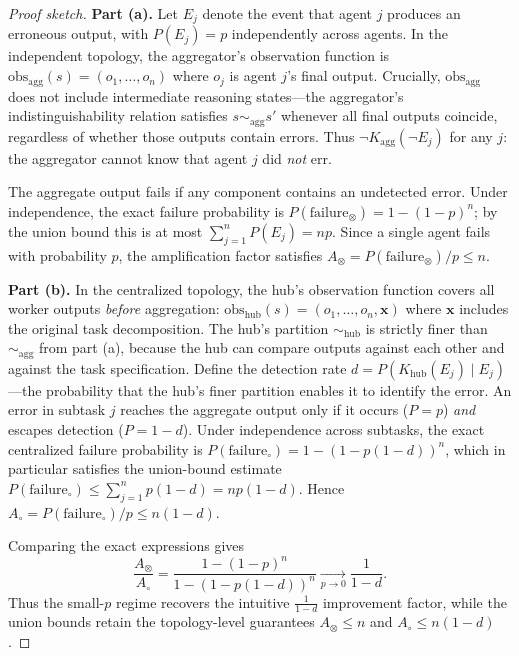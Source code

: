 \begin{proof}[Proof sketch]
\textbf{Part (a).} Let $E_j$ denote the event that agent $j$ produces an erroneous output, with $P(E_j) = p$ independently across agents. In the independent topology, the aggregator's observation function is $\mathrm{obs}_{\mathrm{agg}}(s) = (o_1, \ldots, o_n)$ where $o_j$ is agent $j$'s final output. Crucially, $\mathrm{obs}_{\mathrm{agg}}$ does not include intermediate reasoning states---the aggregator's indistinguishability relation satisfies $s \sim_{\mathrm{agg}} s'$ whenever all final outputs coincide, regardless of whether those outputs contain errors. Thus $\neg K_{\mathrm{agg}}(\neg E_j)$ for any $j$: the aggregator cannot know that agent $j$ did \textit{not} err.

The aggregate output fails if any component contains an undetected error. Under independence, the exact failure probability is $P(\text{failure}_{\otimes}) = 1 - (1-p)^n$; by the union bound this is at most $\sum_{j=1}^{n} P(E_j) = np$. Since a single agent fails with probability $p$, the amplification factor satisfies $A_{\otimes} = P(\text{failure}_{\otimes})/p \le n$.

\textbf{Part (b).} In the centralized topology, the hub's observation function covers all worker outputs \textit{before} aggregation: $\mathrm{obs}_{\mathrm{hub}}(s) = (o_1, \ldots, o_n, \mathbf{x})$ where $\mathbf{x}$ includes the original task decomposition. The hub's partition $\sim_{\mathrm{hub}}$ is strictly finer than $\sim_{\mathrm{agg}}$ from part (a), because the hub can compare outputs against each other and against the task specification. Define the detection rate $d = P(K_{\mathrm{hub}}(E_j) \mid E_j)$---the probability that the hub's finer partition enables it to identify the error. An error in subtask $j$ reaches the aggregate output only if it occurs ($P = p$) \textit{and} escapes detection ($P = 1-d$). Under independence across subtasks, the exact centralized failure probability is $P(\text{failure}_{\circ}) = 1 - (1-p(1-d))^n$, which in particular satisfies the union-bound estimate $P(\text{failure}_{\circ}) \le \sum_{j=1}^{n} p(1-d) = np(1-d)$. Hence $A_{\circ} = P(\text{failure}_{\circ})/p \le n(1-d)$.

Comparing the exact expressions gives
\[
\frac{A_{\otimes}}{A_{\circ}} =
\frac{1 - (1-p)^n}{1 - (1-p(1-d))^n}
\xrightarrow[p \to 0]{} \frac{1}{1-d}.
\]
Thus the small-$p$ regime recovers the intuitive $\frac{1}{1-d}$ improvement factor, while the union bounds retain the topology-level guarantees $A_{\otimes} \le n$ and $A_{\circ} \le n(1-d)$.
\end{proof}

